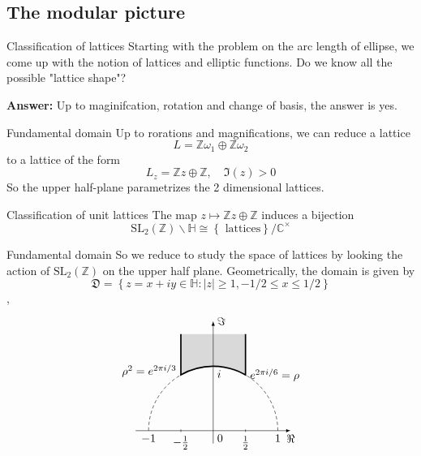 \documentclass[pdf]{beamer}
\begin{document}
\subsection{The modular picture}
\begin{frame}{Classification of lattices}
Starting with the problem on the arc length of ellipse, we come up with the notion of lattices and elliptic functions. Do we know all the possible "lattice shape"?\vspace{3em}

\pause
\textbf{Answer:} Up to maginifcation, rotation and change of basis, the answer is yes.
\end{frame}
\begin{frame}{Fundamental domain}
Up to rorations and magnifications, we can reduce a lattice
\[L = \mathbb{Z}\omega_1 \oplus \mathbb{Z}\omega_2\]
to a lattice of the form
\[L_z = \mathbb{Z}z\oplus\mathbb{Z}, \quad \Im(z)>0\]
So the upper half-plane parametrizes the 2 dimensional lattices.
\begin{block}{Classification of unit lattices}
    The map $z \mapsto \mathbb{Z}z\oplus\mathbb{Z}$ induces a bijection
    \[\text{SL}_2(\mathbb{Z}) \backslash\mathbb{H} \cong \left\lbrace \text{ lattices}\right\rbrace/\mathbb{C^\times}\]
\end{block}

\end{frame}
\begin{frame}{Fundamental domain}
So we reduce to study the space of lattices by looking the action of $\text{SL}_2(\mathbb{Z})$ on the upper half plane. Geometrically, the domain is given by 
  \[\mathfrak{D} = \left\lbrace z=x+iy \in \mathbb{H}: |z| \ge 1,-1/2 \le x \le 1/2 \right\rbrace \],
\pause
\[
  \begin{tikzpicture}[scale=2]
    \draw[densely dashed] (1,0) arc (0:60:1) (-1,0) arc (180:120:1);
    \draw[very thick, fill=gray!30] (.5,1.5) --node[right, pos=1]{$e^{2\pi i/6}=\rho$} (60:1) arc (60:120:1)
    --node[left, pos=.1]{$\rho^2=e^{2\pi i/3}$} (-.5,1.5);
    \draw[-latex] (-1.2,0) -- (1.2,0)node[below]{$\Re$};
    \draw[-latex] (0,-.2) -- (0,1.7)node[right]{$\Im$};
    \path(-1,0) --node[below, pos=0]{$-1$}node[below right, pos=.5]{0}node[below, pos=1]{1} (1,0)
    (0,1)node[below right]{$i$};
    \draw(-.5,.02)--(-.5,-.02)node[below]{$-\frac{1}{2}$}(.5,.02)--(.5,-.02)node[below]{$\frac{1}{2}$};
  \end{tikzpicture}\]
\end{frame}
\end{document}
